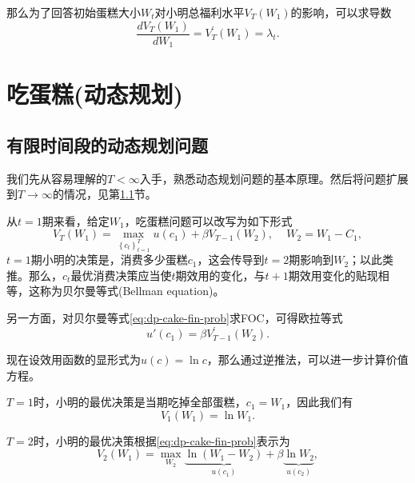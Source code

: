 那么为了回答初始蛋糕大小$W_{t}$对小明总福利水平$V_{T} \left( W_{1} \right)$的影响，可以求导数
\begin{equation*}
  \frac{d V_{T} \left(W_{1} \right)}{d W_{1}}
  = V_{T}^{'} \left( W_{1} \right) = \lambda_{t}.
\end{equation*}

\section{吃蛋糕(动态规划)}
\label{sec:dp-cake-dy}

\subsection{有限时间段的动态规划问题}
\label{sec:dp-cake-finite}
我们先从容易理解的$T < \infty$入手，熟悉动态规划问题的基本原理。然后将问题扩展到$T \rightarrow \infty$的情况，见第\ref{sec:dp-cake-finite}节。

从$t=1$期来看，给定$W_{1}$，吃蛋糕问题可以改写为如下形式
\begin{equation}
  \label{eq:dp-cake-fin-prob}
  V_{T} \left( W_{1} \right) = \max_{\left\{ c_{t}\right\}_{t=1}^{T}} u \left( c_{1} \right)+ \beta V_{T-1} \left(W_{2} \right), \quad \, W_{2} = W_{1} - C_{1},
\end{equation}
$t=1$期小明的决策是，消费多少蛋糕$c_{1}$，这会传导到$t=2$期影响到$W_{2}$；以此类推。那么，$c_{t}$最优消费决策应当使$t$期效用的变化，与$t+1$期效用变化的贴现相等，这称为贝尔曼等式(Bellman equation)。

另一方面，对贝尔曼等式\eqref{eq:dp-cake-fin-prob}求FOC，可得欧拉等式
\begin{equation}
  \label{eq:dp-cake-fin-foc}
  u'\left( c_{1} \right)   = \beta V_{T-1}^{'} \left(W_{2} \right).
\end{equation}

现在设效用函数的显形式为$u(c) = \ln c$，那么通过逆推法，可以进一步计算价值方程。

$T=1$时，小明的最优决策是当期吃掉全部蛋糕，$c_{1}=W_{1}$，因此我们有
\begin{equation}
  \label{eq:dp-cake-fin-t-1}
  V_{1} \left( W_{1} \right) = \ln W_{1}.
\end{equation}

$T=2$时，小明的最优决策根据\eqref{eq:dp-cake-fin-prob}表示为
\begin{equation}
  \label{eq:dp-cake-fin-t-2}
  V_{2} \left( W_{1} \right) = \max_{W_{2}} \underbrace{
  \ln \left( W_{1} - W_{2} \right)
  }_{u(c_{1})} + \beta \underbrace{
  \ln W_{2}
  }_{u(c_{2})},
\end{equation}

